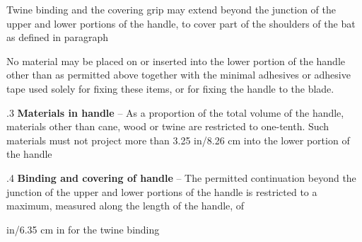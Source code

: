 \documentclass[12pt]{article}
\begin{document}
\vspace{\baselineskip}
\begin{adjustwidth}{0.5in}{0.12in}
{\fontsize{9pt}{10.8pt}\selectfont Twine binding and the covering grip may extend beyond the junction of the upper and lower portions of the handle, to cover part of the shoulders of the bat as defined in paragraph \par}\par

\end{adjustwidth}


\vspace{\baselineskip}
\begin{adjustwidth}{0.5in}{0.07in}
{\fontsize{9pt}{10.8pt}\selectfont No material may be placed on or inserted into the lower portion of the handle other than as permitted above together with the minimal adhesives or adhesive tape used solely for fixing these items, or for fixing the handle to the blade.\par}\par

\end{adjustwidth}


\vspace{\baselineskip}
\begin{adjustwidth}{0.5in}{0.08in}
{\fontsize{9pt}{10.8pt}.3 \tabto{0.49in} \textbf{Materials in handle }–\textbf{ }As a proportion of the total volume of the handle, materials other than cane, wood or\textbf{ }twine are restricted to one-tenth. Such materials must not project more than 3.25 in/8.26 cm into the lower portion of the handle\par}\par

\end{adjustwidth}


\vspace{\baselineskip}
\begin{adjustwidth}{0.5in}{0.12in}
{\fontsize{9pt}{10.8pt}.4 \tabto{0.49in} \textbf{Binding and covering of handle }–\textbf{ }The permitted continuation beyond the junction of the upper and lower\textbf{ }portions of the handle is restricted to a maximum, measured along the length of the handle, of\par}\par

\end{adjustwidth}


\vspace{\baselineskip}
\begin{adjustwidth}{0.5in}{0.0in}
{\fontsize{9pt}{10.8pt} in/6.35 cm in for the twine binding\par}\par

\end{adjustwidth}
\end{document}
